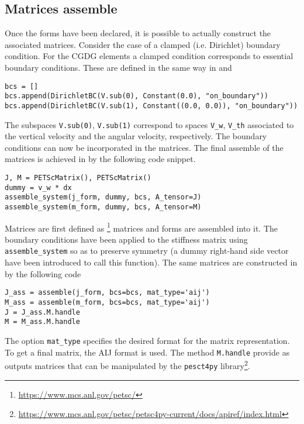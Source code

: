 \subsection*{Matrices assemble}
Once the forms have been declared, it is possible to actually construct the associated matrices. Consider the case of a clamped (i.e. Dirichlet) boundary condition. For the CGDG elements a clamped condition corresponds to essential boundary conditions. These are defined in the same way in \fenics and \firedrake
\begin{tcolorbox}[title = Dirichlet boundary conditions (\fenics \& \firedrake), coltitle=white, breakable, size=fbox, boxrule=1pt, pad at break*=1mm, enlarge top by=0.25em, enlarge bottom by=0.5em]
\begin{Verbatim}[tabsize=4]
bcs = []
bcs.append(DirichletBC(V.sub(0), Constant(0.0), "on_boundary"))
bcs.append(DirichletBC(V.sub(1), Constant((0.0, 0.0)), "on_boundary"))
\end{Verbatim}
\end{tcolorbox}
The subspaces \verb|V.sub(0)|, \verb|V.sub(1)| correspond to spaces \verb|V_w|, \verb|V_th| associated to the vertical velocity and the angular velocity, respectively. The boundary conditions can now be incorporated in the matrices. The final assemble of the matrices is achieved in \fenics by the following code snippet.
\begin{tcolorbox}[title = Matrices assemble in  \fenics, coltitle=black, breakable, size=fbox, boxrule=1pt, pad at break*=1mm, colframe=red, enlarge top by=0.25em, enlarge bottom by=0.5em]
\begin{Verbatim}[tabsize=4]
J, M = PETScMatrix(), PETScMatrix()
dummy = v_w * dx
assemble_system(j_form, dummy, bcs, A_tensor=J)
assemble_system(m_form, dummy, bcs, A_tensor=M)
\end{Verbatim}
\end{tcolorbox}
Matrices are first defined as {}\footnote{\url{https://www.mcs.anl.gov/petsc/}} matrices and forms are assembled into it. The boundary conditions have been applied to the stiffness matrix using \verb|assemble_system| so as to preserve symmetry (a dummy right-hand side vector have been introduced to call this function). The same matrices are constructed in \firedrake by the following code
\begin{tcolorbox}[title = Matrices assemble in  \firedrake, coltitle=black, breakable, size=fbox, boxrule=1pt, pad at break*=1mm, colframe=cyan, enlarge top by=0.25em, enlarge bottom by=0.5em]
\begin{Verbatim}[tabsize=4]
J_ass = assemble(j_form, bcs=bcs, mat_type='aij')
M_ass = assemble(m_form, bcs=bcs, mat_type='aij')
J = J_ass.M.handle
M = M_ass.M.handle
\end{Verbatim}
\end{tcolorbox}
The option \verb|mat_type| specifies the desired format for the matrix representation. To get a final {} matrix, the AIJ format is used. The method \verb|M.handle| provide as outputs {} matrices that can be manipulated by the \verb|pesct4py| library\footnote{\url{https://www.mcs.anl.gov/petsc/petsc4py-current/docs/apiref/index.html}}. \\

